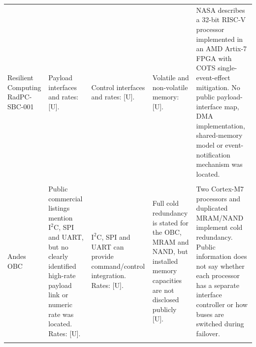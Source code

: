 \documentclass[10pt]{../datasheet}
\let\cite\citep
\begin{document}
\begin{landscape}
\begin{longtable}{|p{3.2cm}|p{4.5cm}|p{4.5cm}|p{4.5cm}|p{5.5cm}|}
    Resilient Computing RadPC-SBC-001 \cite{nasa_soa_2026}             &
    Payload interfaces and rates: [U].                                 & Control interfaces and rates: [U].
                                                                       & Volatile and non-volatile memory: [U].
                                                                       & NASA describes a 32-bit RISC-V processor implemented in an AMD Artix-7
    FPGA with COTS single-event-effect mitigation. No public payload-interface
    map, DMA implementation, shared-memory model or event-notification mechanism
    was located.
    \\
    \cline{2-5}
                                                                       &                                                                            &                                                  &                                           & \\ \hline\hline

    Andes OBC \cite[p.~236]{nasa_soa_2024}\cite[p.~250]{nasa_soa_2026} &
    Public commercial listings mention $\text{I}^2\text{C}$, SPI and UART, but
    no clearly identified high-rate payload link or numeric rate was located.
    Rates: [U].                                                        & $\text{I}^2\text{C}$, SPI and UART can provide
    command/control integration. Rates: [U].
                                                                       & Full cold redundancy is stated for the OBC, MRAM and NAND, but installed
    memory capacities are not disclosed publicly [U].                  & Two
    Cortex-M7 processors and duplicated MRAM/NAND implement cold redundancy.
    Public information does not say whether each processor has a separate
    interface controller or how buses are switched during failover.
    \\
    \cline{2-5}
                                                                       &                                                                            &                                                  &                                           & \\ \hline\hline


\end{longtable}
\end{landscape}
\end{document}
